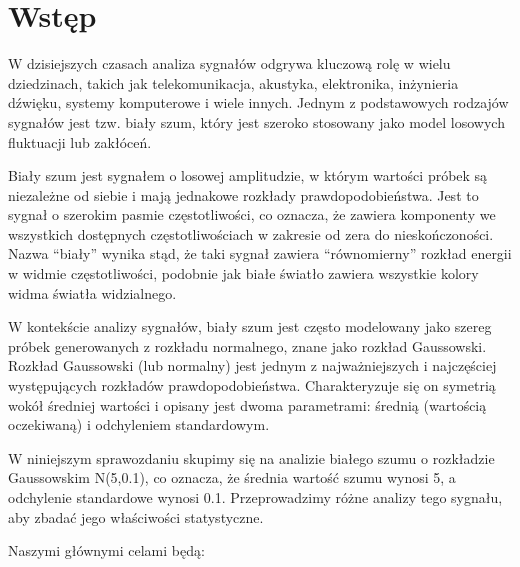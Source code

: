\documentclass[11pt]{article}
\begin{document}
    \hypertarget{wstux119p}{%
\section{Wstęp}\label{wstux119p}}

W dzisiejszych czasach analiza sygnałów odgrywa kluczową rolę w wielu
dziedzinach, takich jak telekomunikacja, akustyka, elektronika,
inżynieria dźwięku, systemy komputerowe i wiele innych. Jednym z
podstawowych rodzajów sygnałów jest tzw. biały szum, który jest szeroko
stosowany jako model losowych fluktuacji lub zakłóceń.

Biały szum jest sygnałem o losowej amplitudzie, w którym wartości próbek
są niezależne od siebie i mają jednakowe rozkłady prawdopodobieństwa.
Jest to sygnał o szerokim pasmie częstotliwości, co oznacza, że zawiera
komponenty we wszystkich dostępnych częstotliwościach w zakresie od zera
do nieskończoności. Nazwa ``biały'' wynika stąd, że taki sygnał zawiera
``równomierny'' rozkład energii w widmie częstotliwości, podobnie jak
białe światło zawiera wszystkie kolory widma światła widzialnego.

W kontekście analizy sygnałów, biały szum jest często modelowany jako
szereg próbek generowanych z rozkładu normalnego, znane jako rozkład
Gaussowski. Rozkład Gaussowski (lub normalny) jest jednym z
najważniejszych i najczęściej występujących rozkładów
prawdopodobieństwa. Charakteryzuje się on symetrią wokół średniej
wartości i opisany jest dwoma parametrami: średnią (wartością
oczekiwaną) i odchyleniem standardowym.

W niniejszym sprawozdaniu skupimy się na analizie białego szumu o
rozkładzie Gaussowskim N(5,0.1), co oznacza, że średnia wartość szumu
wynosi 5, a odchylenie standardowe wynosi 0.1. Przeprowadzimy różne
analizy tego sygnału, aby zbadać jego właściwości statystyczne.

Naszymi głównymi celami będą:
\end{document}
